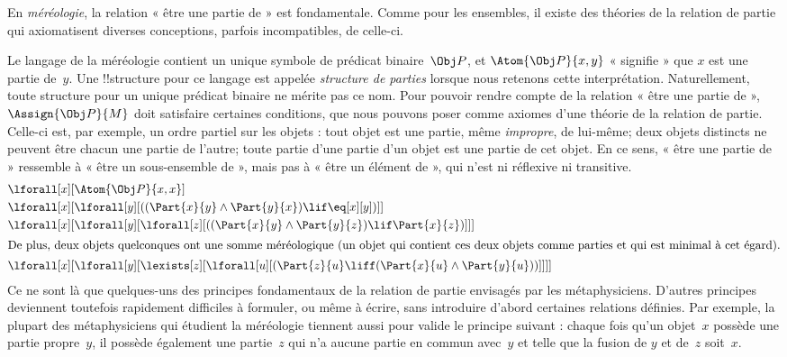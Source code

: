 \documentclass[../../../include/open-logic-section]{subfiles}
\begin{document}
\begin{ex}
En \emph{méréologie}, la relation « être une partie de » est
fondamentale. Comme pour les ensembles, il existe des théories de
la relation de partie qui axiomatisent diverses conceptions,
parfois incompatibles, de celle-ci.

Le langage de la méréologie contient un unique symbole de
prédicat binaire~$\Obj P$, et $\Atom{\Obj P}{x, y}$ « signifie »
que $x$ est une partie de~$y$. Une !!{structure} pour ce langage
est appelée \emph{structure de parties} lorsque nous retenons
cette interprétation. Naturellement, toute structure pour un unique
prédicat binaire ne mérite pas ce nom. Pour pouvoir rendre compte
de la relation « être une partie de », $\Assign{\Obj P}{M}$ doit
satisfaire certaines conditions, que nous pouvons poser comme
axiomes d'une théorie de la relation de partie. Celle-ci est, par
exemple, un ordre partiel sur les objets : tout objet est une
partie, même \emph{impropre}, de lui-même; deux objets distincts ne
peuvent être chacun une partie de l'autre; toute partie d'une
partie d'un objet est une partie de cet objet. En ce sens, « être
une partie de » ressemble à « être un sous-ensemble de », mais
pas à « être un élément de », qui n'est ni réflexive ni transitive.
\begin{align*}
& \lforall[x][\Atom{\Obj P}{x,x}] \\
& \lforall[x][\lforall[y][((\Part{x}{y} \land \Part{y}{x})
      \lif \eq[x][y])]] \\
& \lforall[x][\lforall[y][\lforall[z][((\Part{x}{y} \land
        \Part{y}{z}) \lif \Part{x}{z})]]]\\
\intertext{De plus, deux objets quelconques ont une somme méréologique (un objet
  qui contient ces deux objets comme parties et qui est minimal à cet égard).}  &
\lforall[x][\lforall[y][\lexists[z][\lforall[u][(\Part{z}{u} \liff
        (\Part{x}{u} \land \Part{y}{u}))]]]]
\end{align*}
Ce ne sont là que quelques-uns des principes fondamentaux de la
relation de partie envisagés par les métaphysiciens. D'autres
principes deviennent toutefois rapidement difficiles à formuler,
ou même à écrire, sans introduire d'abord certaines relations
définies. Par exemple, la plupart des métaphysiciens qui étudient
la méréologie tiennent aussi pour valide le principe suivant :
chaque fois qu'un objet~$x$ possède une partie propre~$y$, il
possède également une partie~$z$ qui n'a aucune partie en commun
avec~$y$ et telle que la fusion de $y$ et de~$z$ soit~$x$.
\end{ex}
\end{document}
